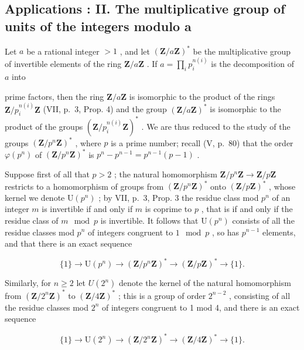 \subsection{Applications : II. The multiplicative group of units of the integers modulo a}

Let \(a\) be a rational integer \(> 1\) , and let \((\mathbf{Z} / a\mathbf{Z})^*\) be the multiplicative group of invertible elements of the ring \(\mathbf{Z} / a\mathbf{Z}\) . If \(a = \prod_{i} p_i^{n(i)}\) is the decomposition of \(a\) into

prime factors, then the ring \(\mathbf{Z}/a\mathbf{Z}\) is isomorphic to the product of the rings \(\mathbf{Z}/p_{i}^{n(i)}\mathbf{Z}\) (VII, p.~3, Prop. 4) and the group \((\mathbf{Z}/a\mathbf{Z})^{*}\) is isomorphic to the product of the groups \((\mathbf{Z}/p_{i}^{n(i)}\mathbf{Z})^{*}\) . We are thus reduced to the study of the groups \((\mathbf{Z}/p^{n}\mathbf{Z})^{*}\) , where \(p\) is a prime number; recall (V, p.~80) that the order \(\varphi(p^{n})\) of \((\mathbf{Z}/p^{n}\mathbf{Z})^{*}\) is \(p^{n}-p^{n-1}=p^{n-1}(p-1)\) .

Suppose first of all that \(p > 2\) ; the natural homomorphism \(\mathbf{Z} / p^n\mathbf{Z} \to \mathbf{Z} / p\mathbf{Z}\) restricts to a homomorphism of groups from \((\mathbf{Z} / p^n\mathbf{Z})^*\) onto \((\mathbf{Z} / p\mathbf{Z})^*\) , whose kernel we denote \(\mathrm{U}(p^n)\) ; by VII, p.~3, Prop. 3 the residue class mod \(p^n\) of an integer \(m\) is invertible if and only if \(m\) is coprime to \(p\) , that is if and only if the residue class of \(m \mod p\) is invertible. It follows that \(\mathrm{U}(p^n)\) consists of all the residue classes mod \(p^n\) of integers congruent to \(1 \mod p\) , so has \(p^{n-1}\) elements, and that there is an exact sequence

\[
\{1 \} \rightarrow \mathrm{U} (p ^ {n}) \rightarrow (\mathbf {Z} / p ^ {n} \mathbf {Z}) ^ {*} \rightarrow (\mathbf {Z} / p \mathbf {Z}) ^ {*} \rightarrow \{1 \}.\tag{3}
\]

Similarly, for \(n \geqslant 2\) let \(U(2^n)\) denote the kernel of the natural homomorphism from \((\mathbf{Z}/2^n\mathbf{Z})^*\) to \((\mathbf{Z}/4\mathbf{Z})^*\) ; this is a group of order \(2^{n-2}\) , consisting of all the residue classes mod \(2^n\) of integers congruent to 1 mod 4, and there is an exact sequence

\[
\{1 \} \rightarrow \mathrm{U} (2 ^ {n}) \rightarrow (\mathbf {Z} / 2 ^ {n} \mathbf {Z}) ^ {*} \rightarrow (\mathbf {Z} / 4 \mathbf {Z}) ^ {*} \rightarrow \{1 \}.\tag{4}
\]

